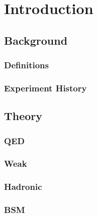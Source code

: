\chapter{Introduction}
\label{chapter:Introduction}
\thispagestyle{myheadings} %

\section{Background}
\label{sec:Background}

\subsection{Definitions}
\label{subsec:Definitions}

\subsection{Experiment History}
\label{subsec:ExperimentHistory}

\section{Theory}
\label{sec:Theory}

\subsection{QED}
\label{subsec:QED}

\subsection{Weak}
\label{subsec:Weak}

\subsection{Hadronic}
\label{subsec:Hadronic}

\subsection{BSM}
\label{subsec:BSM}
